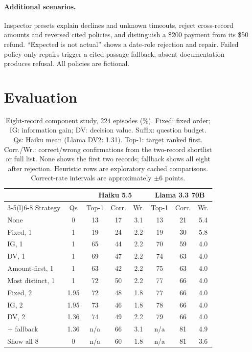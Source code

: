 \documentclass[11pt]{article}
\begin{document}
\paragraph{Additional scenarios.} Inspector presets explain declines and unknown timeouts,
reject cross-record amounts and reversed cited policies, and distinguish a \$200 payment from
its \$50 refund. ``Expected is not actual'' shows a date-role rejection and repair. Failed
policy-only repairs trigger a cited passage fallback; absent documentation produces refusal. All policies are fictional.



\section{Evaluation}
\label{sec:eval}

\begin{table}[t]
\centering\small
\footnotesize
\setlength{\tabcolsep}{2.2pt}
\begin{tabular}{@{}lcccc@{\hspace{5pt}}ccc@{}}
\toprule
 & & \multicolumn{3}{c}{Haiku 5.5} & \multicolumn{3}{c}{Llama 3.3 70B} \\
\cmidrule(lr){3-5}\cmidrule(l){6-8}
Strategy & Qs & Top-1 & Corr. & Wr. & Top-1 & Corr. & Wr. \\
\midrule
None & 0 & 13 & 17 & 3.1 & 13 & 21 & 5.4 \\
Fixed, 1 & 1 & 19 & 24 & 2.2 & 19 & 30 & 5.8 \\
IG, 1 & 1 & 65 & 44 & 2.2 & 70 & 59 & 4.0 \\
DV, 1 & 1 & 69 & 47 & 2.2 & 74 & 63 & 4.0 \\
Amount-first, 1 & 1 & 63 & 42 & 2.2 & 75 & 63 & 4.0 \\
Most distinct, 1 & 1 & 72 & 50 & 2.2 & 77 & 66 & 4.0 \\
Fixed, 2 & 1.95 & 72 & 48 & 1.8 & 77 & 66 & 4.0 \\
IG, 2 & 1.95 & 73 & 46 & 1.8 & 78 & 66 & 4.0 \\
DV, 2 & 1.36 & 74 & 49 & 2.2 & 79 & 66 & 4.0 \\
\quad + fallback & 1.36 & n/a & 66 & 3.1 & n/a & 81 & 4.9 \\
Show all 8 & 0 & n/a & 60 & 1.8 & n/a & 81 & 3.6 \\
\bottomrule
\end{tabular}
\caption{Eight-record component study, 224 episodes (\%). Fixed: fixed order; IG: information gain;
DV: decision value. Suffix: question budget. Qs: Haiku mean (Llama DV2: 1.31). Top-1: target
ranked first. Corr./Wr.: correct/wrong confirmations from the two-record shortlist or full list.
None shows the first two records; fallback shows all eight after rejection. Heuristic rows are
exploratory cached comparisons. Correct-rate intervals are approximately $\pm$6 points.}
\label{tab:main}
\end{table}
\end{document}
